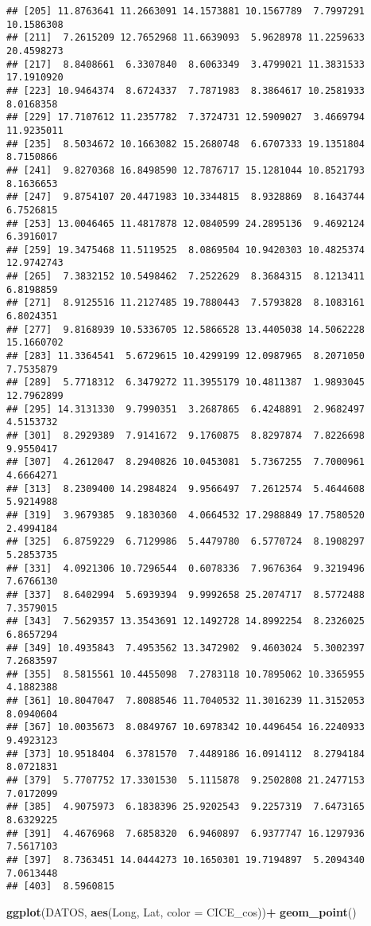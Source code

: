 \documentclass[
]{article}
\newenvironment{Shaded}{\begin{snugshade}}{\end{snugshade}}
\newcommand{\DataTypeTok}[1]{\textcolor[rgb]{0.13,0.29,0.53}{#1}}
\newcommand{\KeywordTok}[1]{\textcolor[rgb]{0.13,0.29,0.53}{\textbf{#1}}}
\newcommand{\NormalTok}[1]{#1}
\newcommand{\OperatorTok}[1]{\textcolor[rgb]{0.81,0.36,0.00}{\textbf{#1}}}
\newcommand{\StringTok}[1]{\textcolor[rgb]{0.31,0.60,0.02}{#1}}
\begin{document}
\begin{verbatim}
## [205] 11.8763641 11.2663091 14.1573881 10.1567789  7.7997291 10.1586308
## [211]  7.2615209 12.7652968 11.6639093  5.9628978 11.2259633 20.4598273
## [217]  8.8408661  6.3307840  8.6063349  3.4799021 11.3831533 17.1910920
## [223] 10.9464374  8.6724337  7.7871983  8.3864617 10.2581933  8.0168358
## [229] 17.7107612 11.2357782  7.3724731 12.5909027  3.4669794 11.9235011
## [235]  8.5034672 10.1663082 15.2680748  6.6707333 19.1351804  8.7150866
## [241]  9.8270368 16.8498590 12.7876717 15.1281044 10.8521793  8.1636653
## [247]  9.8754107 20.4471983 10.3344815  8.9328869  8.1643744  6.7526815
## [253] 13.0046465 11.4817878 12.0840599 24.2895136  9.4692124  6.3916017
## [259] 19.3475468 11.5119525  8.0869504 10.9420303 10.4825374 12.9742743
## [265]  7.3832152 10.5498462  7.2522629  8.3684315  8.1213411  6.8198859
## [271]  8.9125516 11.2127485 19.7880443  7.5793828  8.1083161  6.8024351
## [277]  9.8168939 10.5336705 12.5866528 13.4405038 14.5062228 15.1660702
## [283] 11.3364541  5.6729615 10.4299199 12.0987965  8.2071050  7.7535879
## [289]  5.7718312  6.3479272 11.3955179 10.4811387  1.9893045 12.7962899
## [295] 14.3131330  9.7990351  3.2687865  6.4248891  2.9682497  4.5153732
## [301]  8.2929389  7.9141672  9.1760875  8.8297874  7.8226698  9.9550417
## [307]  4.2612047  8.2940826 10.0453081  5.7367255  7.7000961  4.6664271
## [313]  8.2309400 14.2984824  9.9566497  7.2612574  5.4644608  5.9214988
## [319]  3.9679385  9.1830360  4.0664532 17.2988849 17.7580520  2.4994184
## [325]  6.8759229  6.7129986  5.4479780  6.5770724  8.1908297  5.2853735
## [331]  4.0921306 10.7296544  0.6078336  7.9676364  9.3219496  7.6766130
## [337]  8.6402994  5.6939394  9.9992658 25.2074717  8.5772488  7.3579015
## [343]  7.5629357 13.3543691 12.1492728 14.8992254  8.2326025  6.8657294
## [349] 10.4935843  7.4953562 13.3472902  9.4603024  5.3002397  7.2683597
## [355]  8.5815561 10.4455098  7.2783118 10.7895062 10.3365955  4.1882388
## [361] 10.8047047  7.8088546 11.7040532 11.3016239 11.3152053  8.0940604
## [367] 10.0035673  8.0849767 10.6978342 10.4496454 16.2240933  9.4923123
## [373] 10.9518404  6.3781570  7.4489186 16.0914112  8.2794184  8.0721831
## [379]  5.7707752 17.3301530  5.1115878  9.2502808 21.2477153  7.0172099
## [385]  4.9075973  6.1838396 25.9202543  9.2257319  7.6473165  8.6329225
## [391]  4.4676968  7.6858320  6.9460897  6.9377747 16.1297936  7.5617103
## [397]  8.7363451 14.0444273 10.1650301 19.7194897  5.2094340  7.0613448
## [403]  8.5960815
\end{verbatim}

\begin{Shaded}
\begin{Highlighting}[]
\KeywordTok{ggplot}\NormalTok{(DATOS, }\KeywordTok{aes}\NormalTok{(Long, Lat, }\DataTypeTok{color =}\NormalTok{ CICE_cos))}\OperatorTok{+}
\StringTok{  }\KeywordTok{geom_point}\NormalTok{()}
\end{Highlighting}
\end{Shaded}
\end{document}
